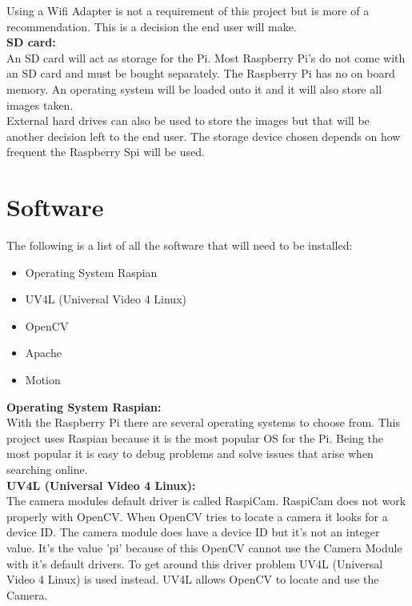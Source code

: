 \documentclass[]{report}
\begin{document}
Using a Wifi Adapter is not a requirement of this project but is more of a recommendation. This is a decision the end user will make.\\

\noindent
{\bf SD card:}\\
\break
An SD card will act as storage for the Pi. Most Raspberry Pi's do not come with an SD card and must be bought separately. The Raspberry Pi has no on board memory. An operating system will be loaded onto it and it will also store all images taken.\\

External hard drives can also be used to store the images but that will be another decision left to the end user. The storage device chosen depends on how frequent the Raspberry Spi will be used.\\

\clearpage
\section{Software}	
\label{sec:software}	
The following is a list of all the software that will need to be installed:
\begin{itemize}
  \item Operating System Raspian \\
  \item UV4L (Universal Video 4 Linux)\\  
  \item OpenCV\\
  \item Apache\\
  \item Motion\\
\end{itemize}

\noindent
{\bf Operating System Raspian:}\\
\break
With the Raspberry Pi there are several operating systems to choose from. This project uses Raspian because it is the most popular OS for the Pi. Being the most popular it is easy to debug problems and solve issues that arise when searching online.\\ 

\noindent
{\bf UV4L (Universal Video 4 Linux):}\\
\break
The camera modules default driver is called RaspiCam. RaspiCam does not work properly with OpenCV. When OpenCV tries to locate a camera it looks for a device ID. The camera module does have a device ID but it's not an integer value. It's the value 'pi' because of this OpenCV cannot use the Camera Module with it's default drivers. To get around this driver problem UV4L (Universal Video 4 Linux) is used instead. UV4L allows OpenCV to locate and use the Camera.
\end{document}
